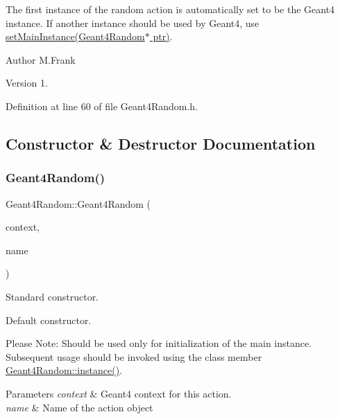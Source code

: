The first instance of the random action is automatically set to be the Geant4 instance. If another instance should be used by Geant4, use \hyperlink{class_d_d4hep_1_1_simulation_1_1_geant4_random_a544fa42f6ae0d64697e366da5e1297b2}{set\+Main\+Instance(\+Geant4\+Random$\ast$ ptr)}.

\begin{DoxyAuthor}{Author}
M.\+Frank 
\end{DoxyAuthor}
\begin{DoxyVersion}{Version}
1. 
\end{DoxyVersion}


Definition at line 60 of file Geant4\+Random.\+h.



\subsection{Constructor \& Destructor Documentation}
\hypertarget{class_d_d4hep_1_1_simulation_1_1_geant4_random_a44e88e26d5ae30b269b81c6d2dfc6511}{}\label{class_d_d4hep_1_1_simulation_1_1_geant4_random_a44e88e26d5ae30b269b81c6d2dfc6511} 
\subsubsection{\texorpdfstring{Geant4\+Random()}{Geant4Random()}}
{\footnotesize\ttfamily Geant4\+Random\+::\+Geant4\+Random (\begin{DoxyParamCaption}\item[{\hyperlink{class_d_d4hep_1_1_simulation_1_1_geant4_context}{Geant4\+Context} $\ast$}]{context,  }\item[{const std\+::string \&}]{name }\end{DoxyParamCaption})}



Standard constructor. 

Default constructor.

Please Note\+: Should be used only for initialization of the main instance. Subsequent usage should be invoked using the class member \hyperlink{class_d_d4hep_1_1_simulation_1_1_geant4_random_a76e4bbadf0c58d9f6ee05decdd200fe6}{Geant4\+Random\+::instance()}.


\begin{DoxyParams}{Parameters}
{\em context} & Geant4 context for this action. \\
\hline
{\em name} & Name of the action object \\
\hline
\end{DoxyParams}


